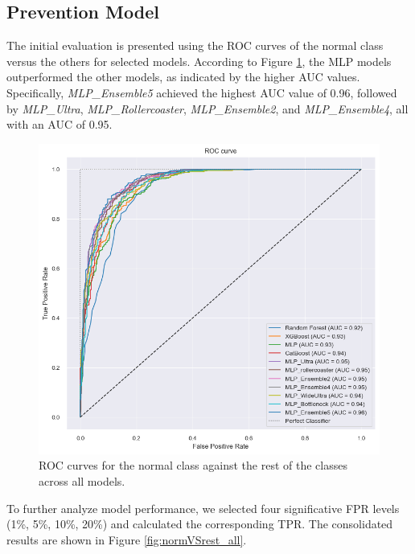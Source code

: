 \subsection{Prevention Model}
The initial evaluation is presented using the ROC curves of the normal class versus the others for selected models.
According to Figure \ref{fig:ROC_normVSrest_allmodels}, the MLP models outperformed the other models, as 
indicated by the higher AUC values.
Specifically, \textit{MLP\_Ensemble5} achieved the highest AUC value of 0.96, followed 
by \textit{MLP\_Ultra}, \textit{MLP\_Rollercoaster}, \textit{MLP\_Ensemble2}, 
and \textit{MLP\_Ensemble4}, all with an AUC of 0.95.

\begin{figure}[H]
    \centering
    \includegraphics[width=1\columnwidth]{./images/ROC_normVSrest_allmodels.png}
    \caption{ROC curves for the normal class against the rest of the classes across all models.}
    \label{fig:ROC_normVSrest_allmodels}
\end{figure}

To further analyze model performance, we selected four significative FPR levels (1\%, 5\%, 10\%, 20\%) and 
calculated the corresponding TPR. The consolidated results are shown in 
Figure \ref{fig:normVSrest_all}.

